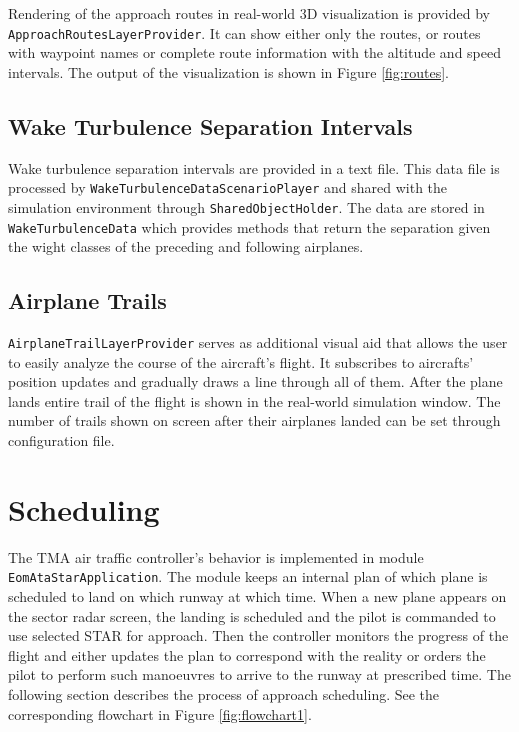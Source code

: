Rendering of the approach routes in real-world 3D visualization is provided by \texttt{Approach\-Routes\-LayerProvider}. It can show either only the routes, or routes with waypoint names or complete route information with the altitude and speed intervals. The output of the visualization is shown in Figure \ref{fig:routes}.

\subsection{Wake Turbulence Separation Intervals}

Wake turbulence separation intervals are provided in a text file. This data file is processed by \texttt{WakeTurbulenceDataScenarioPlayer} and shared with the simulation environment through \texttt{SharedObjectHolder}. The data are stored in \texttt{WakeTurbulenceData} which provides methods that return the separation given the wight classes of the preceding and following airplanes.

\subsection{Airplane Trails}

\texttt{AirplaneTrailLayerProvider} serves as additional visual aid that allows the user to easily analyze the course of the aircraft's flight. It subscribes to aircrafts' position updates and gradually draws a line through all of them. After the plane lands entire trail of the flight is shown in the real-world simulation window. The number of trails shown on screen after their airplanes landed can be set through configuration file.

\section{Scheduling}

The TMA air traffic controller's behavior is implemented in module \texttt{EomAtaStarApplication}. The module keeps an internal plan of which plane is scheduled to land on which runway at which time. When a new plane appears on the sector radar screen, the landing is scheduled and the pilot is commanded to use selected STAR for approach. Then the controller monitors the progress of the flight and either updates the plan to correspond with the reality or orders the pilot to perform such manoeuvres to arrive to the runway at prescribed time. The following section describes the process of approach scheduling. See the corresponding flowchart in Figure \ref{fig:flowchart1}.

